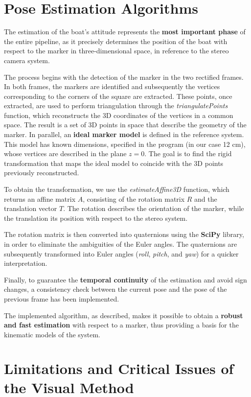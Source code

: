 \section{Pose Estimation Algorithms}
The estimation of the boat’s attitude represents the \textbf{most important phase} of the entire pipeline, as it precisely determines the position of the boat with respect to the marker in three-dimensional space, in reference to the stereo camera system.  

The process begins with the detection of the marker in the two rectified frames. In both frames, the markers are identified and subsequently the vertices corresponding to the corners of the square are extracted. These points, once extracted, are used to perform triangulation through the \textit{triangulatePoints} function, which reconstructs the 3D coordinates of the vertices in a common space. The result is a set of 3D points in space that describe the geometry of the marker.
In parallel, an \textbf{ideal marker model} is defined in the reference system. This model has known dimensions, specified in the program (in our case 12 cm), whose vertices are described in the plane \(z = 0\). The goal is to find the rigid transformation that maps the ideal model to coincide with the 3D points previously reconstructed. 

To obtain the transformation, we use the \textit{estimateAffine3D} function, which returns an affine matrix \(A\), consisting of the rotation matrix \(R\) and the translation vector \(T\). The rotation describes the orientation of the marker, while the translation its position with respect to the stereo system.  

The rotation matrix is then converted into quaternions using the \textbf{SciPy} library, in order to eliminate the ambiguities of the Euler angles. The quaternions are subsequently transformed into Euler angles (\textit{roll}, \textit{pitch}, and \textit{yaw}) for a quicker interpretation.  

Finally, to guarantee the \textbf{temporal continuity} of the estimation and avoid sign changes, a consistency check between the current pose and the pose of the previous frame has been implemented.  

The implemented algorithm, as described, makes it possible to obtain a \textbf{robust and fast estimation} with respect to a marker, thus providing a basis for the kinematic models of the system.

\section[Limitations and Critical Issues]{Limitations and Critical Issues of the Visual Method}

